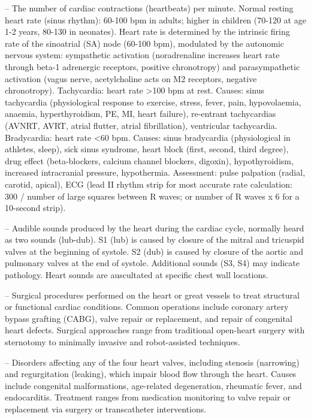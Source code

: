 -- The number of cardiac contractions (heartbeats) per minute. Normal resting heart rate (sinus rhythm): 60-100 bpm in adults; higher in children (70-120 at age 1-2 years, 80-130 in neonates). Heart rate is determined by the intrinsic firing rate of the sinoatrial (SA) node (60-100 bpm), modulated by the autonomic nervous system: sympathetic activation (noradrenaline increases heart rate through beta-1 adrenergic receptors, positive chronotropy) and parasympathetic activation (vagus nerve, acetylcholine acts on M2 receptors, negative chronotropy). Tachycardia: heart rate >100 bpm at rest. Causes: sinus tachycardia (physiological response to exercise, stress, fever, pain, hypovolaemia, anaemia, hyperthyroidism, PE, MI, heart failure), re-entrant tachycardias (AVNRT, AVRT, atrial flutter, atrial fibrillation), ventricular tachycardia. Bradycardia: heart rate <60 bpm. Causes: sinus bradycardia (physiological in athletes, sleep), sick sinus syndrome, heart block (first, second, third degree), drug effect (beta-blockers, calcium channel blockers, digoxin), hypothyroidism, increased intracranial pressure, hypothermia. Assessment: pulse palpation (radial, carotid, apical), ECG (lead II rhythm strip for most accurate rate calculation: 300 / number of large squares between R waves; or number of R waves x 6 for a 10-second strip).

-- Audible sounds produced by the heart during the cardiac cycle, normally heard as two sounds (lub-dub). S1 (lub) is caused by closure of the mitral and tricuspid valves at the beginning of systole. S2 (dub) is caused by closure of the aortic and pulmonary valves at the end of systole. Additional sounds (S3, S4) may indicate pathology. Heart sounds are auscultated at specific chest wall locations.

-- Surgical procedures performed on the heart or great vessels to treat structural or functional cardiac conditions. Common operations include coronary artery bypass grafting (CABG), valve repair or replacement, and repair of congenital heart defects. Surgical approaches range from traditional open-heart surgery with sternotomy to minimally invasive and robot-assisted techniques.

-- Disorders affecting any of the four heart valves, including stenosis (narrowing) and regurgitation (leaking), which impair blood flow through the heart. Causes include congenital malformations, age-related degeneration, rheumatic fever, and endocarditis. Treatment ranges from medication monitoring to valve repair or replacement via surgery or transcatheter interventions.

